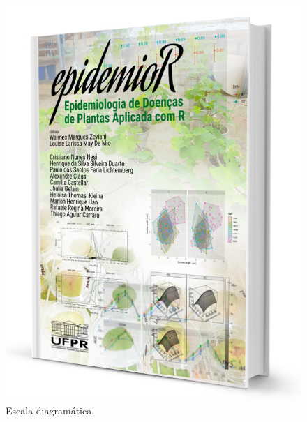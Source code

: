 \documentclass[a4paper,]{book}
\begin{document}
\begin{figure}

{\centering \includegraphics[width=1\linewidth]{./config/bookcover} 

}

\caption{Escala diagramática.}\label{fig:image1}
\end{figure}


\end{document}
